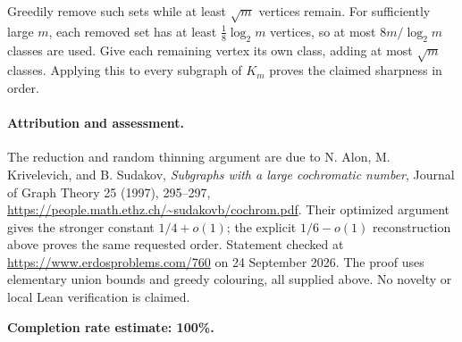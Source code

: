 Greedily remove such sets while at least \(\sqrt m\) vertices remain. For sufficiently large \(m\), each removed set has at least \(\tfrac18\log_2m\) vertices, so at most \(8m/\log_2m\) classes are used. Give each remaining vertex its own class, adding at most \(\sqrt m\) classes. Applying this to every subgraph of \(K_m\) proves the claimed sharpness in order.

\paragraph{Attribution and assessment.}
The reduction and random thinning argument are due to N. Alon, M. Krivelevich, and B. Sudakov, \emph{Subgraphs with a large cochromatic number}, Journal of Graph Theory 25 (1997), 295--297, \url{https://people.math.ethz.ch/~sudakovb/cochrom.pdf}. Their optimized argument gives the stronger constant \(1/4+o(1)\); the explicit \(1/6-o(1)\) reconstruction above proves the same requested order. Statement checked at \url{https://www.erdosproblems.com/760} on 24 September 2026. The proof uses elementary union bounds and greedy colouring, all supplied above. No novelty or local Lean verification is claimed.

\textbf{Completion rate estimate: 100\%.}
